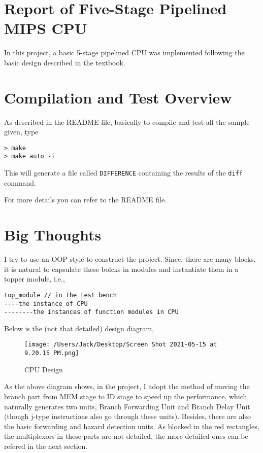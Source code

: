 \documentclass[
]{article}
\author{Zhang Baozhe}
\date{\today}
\begin{document}
\hypertarget{header-n0}{%
\section{Report of Five-Stage Pipelined MIPS CPU}\label{header-n0}}

In this project, a basic 5-stage pipelined CPU was implemented following
the basic design described in the textbook.

\hypertarget{header-n14}{%
\section{Compilation and Test Overview}\label{header-n14}}

As described in the README file, basically to compile and test all the
sample given, type

\begin{verbatim}
> make 
> make auto -i
\end{verbatim}

This will generate a file called \texttt{DIFFERENCE} containing the
results of the \texttt{diff} command.

For more details you can refer to the README file.

\hypertarget{header-n4}{%
\section{Big Thoughts}\label{header-n4}}

I try to use an OOP style to construct the project. Since, there are
many blocks, it is natural to capsulate these bolcks in modules and
instantiate them in a topper module, i.e.,

\begin{verbatim}
top_module // in the test bench
----the instance of CPU
--------the instances of function modules in CPU
\end{verbatim}

Below is the (not that detailed) design diagram,

\begin{figure}
\centering
\texttt{[image: /Users/Jack/Desktop/Screen Shot 2021-05-15 at 9.20.15 PM.png]}
\caption{CPU Design}
\end{figure}

As the above diagram shows, in the project, I adopt the method of moving
the branch part from MEM stage to ID stage to speed up the performance,
which naturally generates two units, Branch Forwarding Unit and Branch
Delay Unit (though j-type instructions also go through these units).
Besides, there are also the basic forwarding and hazard detection units.
As blocked in the red rectangles, the multiplexors in these parts are
not detailed, the more detailed ones can be refered in the next section.
\end{document}
